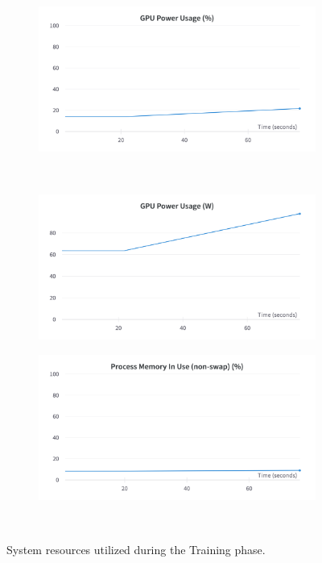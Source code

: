 \begin{figure}[H]
\begin{subfigure}{0.43\textwidth}
	\end{subfigure}
	\hspace{.5cm}
	\begin{subfigure}{0.43\textwidth}
		\centering
		\includegraphics[width=\textwidth]{chapters/3_models/imgs/ufnc/ufncusageperc.png}
	\end{subfigure}\\
	\begin{subfigure}{0.43\textwidth}
		\centering
		\includegraphics[width=\textwidth]{chapters/3_models/imgs/ufnc/ufncusagew.png}
	\end{subfigure}
	\hspace{.5cm}
	\begin{subfigure}{0.43\textwidth}
		\centering
		\includegraphics[width=\textwidth]{chapters/3_models/imgs/ufnc/ufcnmemram.png}
	\end{subfigure}\\
	\caption{System resources utilized during the Training phase.}
	\label{fig:ufcnsysusage}
\end{figure}

